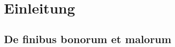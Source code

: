 %
%
%
%
\section{Einleitung
\label{helmholtz:section:teil1}}


\subsection{De finibus bonorum et malorum
\label{helmholtz:subsection:malorum}}



